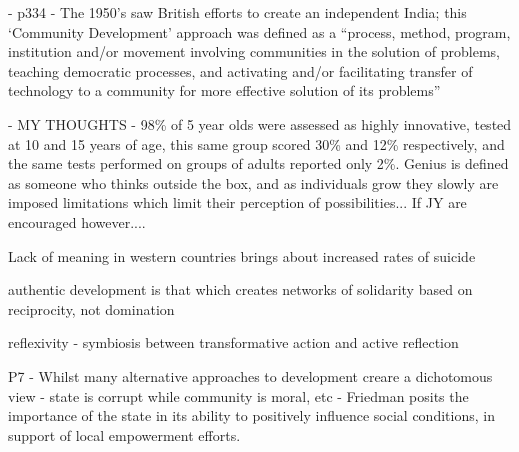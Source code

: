 






- p334 - The 1950's saw British efforts to create an independent India; this `Community Development' approach was defined as a “process, method, program, institution and/or movement involving communities in the solution of problems, teaching democratic processes, and activating and/or facilitating transfer of technology to a community for more effective solution of its problems” \citep{Ramisch2009}



- MY THOUGHTS - 98\% of 5 year olds were assessed as highly innovative, tested at 10 and 15 years of age, this same group scored 30\% and 12\% respectively, and the same tests performed on groups of adults reported only 2\%. Genius is defined as someone who thinks outside the box, and as individuals grow they slowly are imposed limitations which limit their perception of possibilities... If JY are encouraged however.... %



Lack of meaning in western countries brings about increased rates of suicide \citep[][p481]{Goulet1980} %

authentic development is that which creates networks of solidarity based on reciprocity, not domination \citep{Goulet1980}

reflexivity - symbiosis between transformative action and active reflection \citep{Goulet1980}








P7 - Whilst many alternative approaches to development creare a dichotomous view - state is corrupt while community is moral, etc - Friedman posits the importance of the state in its ability to positively influence social conditions, in support of local empowerment efforts. \cite{Friedmann1992}

